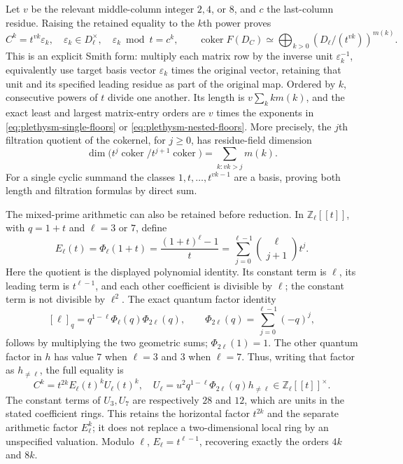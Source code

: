 Let $v$ be the relevant middle-column integer $2,4$, or $8$, and
$c$ the last-column residue. Raising the retained equality to the
$k$th power proves
\begin{equation}\label{eq:plethysm-smith-orders}
 C^k=t^{vk}\varepsilon_k,\quad\varepsilon_k\in D_\ell^\times,
 \quad\varepsilon_k\bmod t=c^k,\qquad
 \operatorname{coker}F(D_C)\simeq
 \bigoplus_{k>0}(D_\ell/(t^{vk}))^{m(k)}.
\end{equation}
This is an explicit Smith form: multiply each matrix row by
the inverse unit $\varepsilon_k^{-1}$, equivalently use target basis
vector $\varepsilon_k$ times the original vector, retaining that unit and its
specified leading residue as part of the original map. Ordered by
$k$, consecutive powers of $t$ divide one another. Its length is
$v\sum_kkm(k)$, and the exact least and largest matrix-entry orders are $v$ times
the exponents in \eqref{eq:plethysm-single-floors} or
\eqref{eq:plethysm-nested-floors}.
More precisely, the $j$th filtration quotient of the cokernel, for
$j\ge0$, has residue-field dimension
\[
 \dim\big(t^j\operatorname{coker}/t^{j+1}\operatorname{coker}\big)
 =\sum_{k:vk>j}m(k).
\]
For a single cyclic summand the classes $1,t,\ldots,t^{vk-1}$ are
a basis, proving both length and filtration formulas by direct sum.

The mixed-prime arithmetic can also be retained before reduction.
In $\mathbb Z_\ell[[t]]$, with $q=1+t$ and $\ell=3$ or $7$, define
\[
 E_\ell(t)=\Phi_\ell(1+t)
 =\frac{(1+t)^\ell-1}{t}
 =\sum_{j=0}^{\ell-1}\binom\ell{j+1}t^j.
\]
Here the quotient is the displayed polynomial identity. Its constant
term is $\ell$, its leading term is $t^{\ell-1}$, and each other
coefficient is divisible by $\ell$; the constant term is not
divisible by $\ell^2$. The exact quantum factor identity
\[
 [\ell]_q=q^{1-\ell}\Phi_\ell(q)\Phi_{2\ell}(q),\qquad
 \Phi_{2\ell}(q)=\sum_{j=0}^{\ell-1}(-q)^j,
\]
follows by multiplying the two geometric sums; $\Phi_{2\ell}(1)=1$.
The other quantum factor in $h$ has value $7$ when $\ell=3$ and
$3$ when $\ell=7$. Thus, writing that factor as $h_{\ne\ell}$,
the full equality is
\begin{equation}\label{eq:plethysm-mixed-local}
 C^k=t^{2k}E_\ell(t)^k U_\ell(t)^k,
 \quad U_\ell=u^2q^{1-\ell}\Phi_{2\ell}(q)h_{\ne\ell}
           \in\mathbb Z_\ell[[t]]^\times.
\end{equation}
The constant terms of $U_3,U_7$ are respectively $28$ and $12$,
which are units in the stated coefficient rings. This retains the
horizontal factor $t^{2k}$ and the separate arithmetic factor
$E_\ell^k$; it does not replace a two-dimensional local ring by an
unspecified valuation. Modulo $\ell$, $E_\ell=t^{\ell-1}$, recovering
exactly the orders $4k$ and $8k$.

